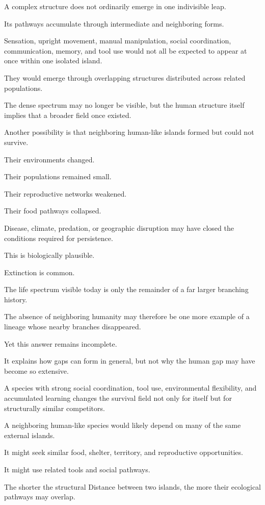 A complex structure does not ordinarily emerge in one indivisible leap.

Its pathways accumulate through intermediate and neighboring forms.

Sensation, upright movement, manual manipulation, social coordination, communication, memory, and tool use would not all be expected to appear at once within one isolated island.

They would emerge through overlapping structures distributed across related populations.

The dense spectrum may no longer be visible, but the human structure itself implies that a broader field once existed.

Another possibility is that neighboring human-like islands formed but could not survive.

Their environments changed.

Their populations remained small.

Their reproductive networks weakened.

Their food pathways collapsed.

Disease, climate, predation, or geographic disruption may have closed the conditions required for persistence.

This is biologically plausible.

Extinction is common.

The life spectrum visible today is only the remainder of a far larger branching history.

The absence of neighboring humanity may therefore be one more example of a lineage whose nearby branches disappeared.

Yet this answer remains incomplete.

It explains how gaps can form in general, but not why the human gap may have become so extensive.

A species with strong social coordination, tool use, environmental flexibility, and accumulated learning changes the survival field not only for itself but for structurally similar competitors.

A neighboring human-like species would likely depend on many of the same external islands.

It might seek similar food, shelter, territory, and reproductive opportunities.

It might use related tools and social pathways.

The shorter the structural Distance between two islands, the more their ecological pathways may overlap.

